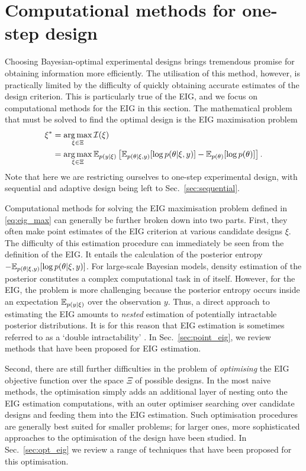 \documentclass[a4paper, 10pt]{report}
\theoremstyle{plain}
\begin{document}
	
	
	
	
	
	\section{Computational methods for one-step design}
	\label{sec:computation}
	Choosing Bayesian-optimal experimental designs brings tremendous promise for obtaining information more efficiently.
	The utilisation of this method, however, is practically limited by the difficulty of quickly obtaining accurate estimates of the design criterion.
	This is particularly true of the EIG, and we focus on computational methods for the EIG in this section.
	The mathematical problem that must be solved to find the optimal design is the EIG maximisation problem
	\begin{equation}\begin{split}
	\label{eq:eig_max}
	\xi^* &= \operatorname*{arg\,max}_{\xi\in\Xi} \mathcal{I}(\xi) \\ &= \operatorname*{arg\,max}_{\xi\in\Xi} \mathbb{E}_{p(y|\xi)}\left[ \mathbb{E}_{p(\theta|\xi,y)}[\log p(\theta|\xi,y)]-\mathbb{E}_{p(\theta)}[\log p(\theta)] \right].
	\end{split}\end{equation}
	Note that here we are restricting ourselves to one-step experimental design, with sequential and adaptive design being left to Sec.~\ref{sec:sequential}.
	
	Computational methods for solving the EIG maximisation problem defined in \eqref{eq:eig_max} can generally be further broken down into two parts. 
	First, they often make point estimates of the EIG criterion at various candidate designs $\xi$.
	The difficulty of this estimation procedure can immediately be seen from the definition of the EIG.
	It entails the calculation of the posterior entropy $-\mathbb{E}_{p(\theta|\xi,y)}[\log p(\theta|\xi,y)]$.
	For large-scale Bayesian models, density estimation of the posterior constitutes a complex computational task in of itself.
	However, for the EIG, the problem is more challenging because the posterior entropy occurs inside an expectation $\mathbb{E}_{p(y|\xi)}$ over the observation $y$. Thus, a direct approach to estimating the EIG amounts to \emph{nested} estimation of potentially intractable posterior distributions.
	It is for this reason that EIG estimation is sometimes referred to as a `double intractability' \citep{foster2019variational}.
	In Sec.~\ref{sec:point_eig}, we review methods that have been proposed for EIG estimation.
	
	Second, there are still further difficulties in the problem of \emph{optimising} the EIG objective function over the space $\Xi$ of possible designs.
	In the most naive methods, the optimisation simply adds an additional layer of nesting onto the EIG estimation computations, with an outer optimiser searching over candidate designs and feeding them into the EIG estimation.
	Such optimisation procedures are generally best suited for smaller problems; for larger ones, more sophisticated approaches to the optimisation of the design have been studied.
	In Sec.~\ref{sec:opt_eig} we review a range of techniques that have been proposed for this optimisation.
	
\end{document}
